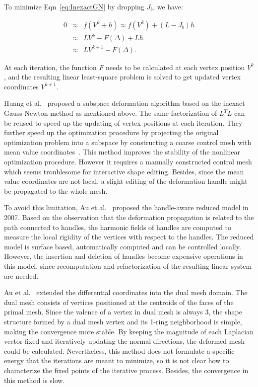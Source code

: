 To minimize Eqn~\ref{eq:InexactGN} by dropping $J_b$, we have:

\begin{eqnarray}
\label{eq:InGN}
   0  &\approx& f(V^k+h) \approx f(V^k) + (L-J_b)h\nonumber\\
   &\approx& LV^k - F(\Delta) + Lh \nonumber \\
   &\approx& LV^{k+1} - F(\Delta).
\end{eqnarray}

At each iteration, the function $F$ needs to be calculated at each vertex position $V^k$, and the resulting linear least-square problem is solved to get updated vertex coordinates $V^{k+1}$.

Huang et al.~\cite{HSLZWTBGS06} proposed a subspace deformation algorithm based on the inexact Gauss-Newton method as mentioned above. The same factorization of $L^TL$ can be reused to speed up the updating of vertex positions at each iteration. They further speed up the optimization procedure by projecting the original optimization problem into a subspace by constructing a coarse control mesh with mean value coordinates~\cite{JSW05}. This method improves the stability of the nonlinear optimization procedure. However it requires a manually constructed control mesh which seems troublesome for interactive shape editing. Besides, since the mean value coordinates are not local, a slight editing of the deformation handle might be propagated to the whole mesh.

To avoid this limitation, Au et al.~\cite{AFTC07} proposed the handle-aware reduced model in 2007. Based on the observation that the deformation propagation is related to the path connected to handles, the harmonic fields of handles are computed to measure the local rigidity of the vertices with respect to the handles. The reduced model is surface based, automatically computed and can be controlled locally. However, the insertion and deletion of handles become expensive operations in this model, since recomputation and refactorization of the resulting linear system are needed.

Au et al.~\cite{ATLF06} extended the differential coordinates into the dual mesh domain. The dual mesh consists of vertices positioned at the centroids of the faces of the primal mesh. Since the valence of a vertex in dual mesh is always 3, the shape structure formed by a dual mesh vertex and its 1-ring neighborhood is simple, making the convergence more stable. By keeping the magnitude of each Laplacian vector fixed and iteratively updating the normal directions, the deformed mesh could be calculated. Nevertheless, this method does not formulate a specific energy that the iterations are meant to minimize, so it is not clear how to characterize the fixed points of the iterative process. Besides, the convergence in this method is slow.

